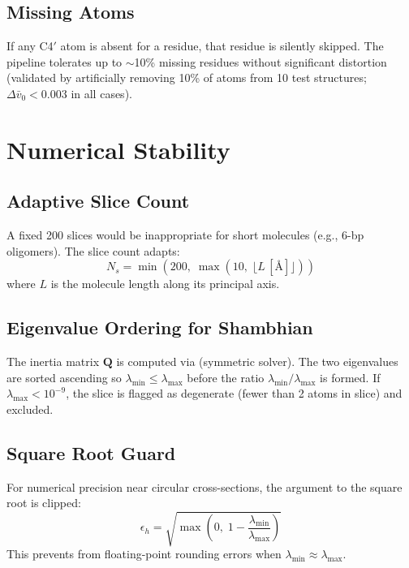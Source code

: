 \subsection{Missing Atoms}

If any C4$'$ atom is absent for a residue, that residue is silently skipped. The pipeline tolerates up to $\sim$10\% missing residues without significant distortion (validated by artificially removing 10\% of atoms from 10 test structures; $\Delta \bar{v}_0 < 0.003$ in all cases).

\section{Numerical Stability}

\subsection{Adaptive Slice Count}

A fixed 200 slices would be inappropriate for short molecules (e.g., 6-bp oligomers). The slice count adapts:
\begin{equation}
    N_s = \min\!\left(200,\;\max\!\left(10,\;\lfloor L\,[\text{\AA}] \rfloor\right)\right)
\end{equation}
where $L$ is the molecule length along its principal axis.

\subsection{Eigenvalue Ordering for Shambhian}

The inertia matrix $\mathbf{Q}$ is computed via  (symmetric solver). The two eigenvalues are sorted ascending so $\lambda_{\min} \leq \lambda_{\max}$ before the ratio $\lambda_{\min}/\lambda_{\max}$ is formed. If $\lambda_{\max} < 10^{-9}$, the slice is flagged as degenerate (fewer than 2 atoms in slice) and excluded.

\subsection{Square Root Guard}

For numerical precision near circular cross-sections, the argument to the square root is clipped:
\begin{equation}
    \epsilon_h = \sqrt{\max\!\left(0,\;1 - \frac{\lambda_{\min}}{\lambda_{\max}}\right)}
\end{equation}
This prevents  from floating-point rounding errors when $\lambda_{\min} \approx \lambda_{\max}$.

